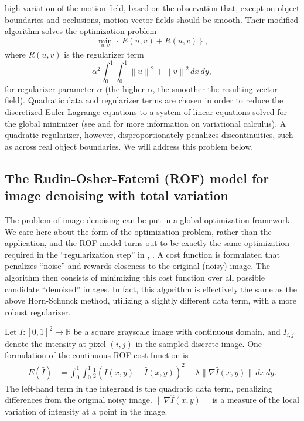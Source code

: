 \documentclass[conference]{IEEEtran}
\newcommand{\norm}[1]{\left\lVert#1\right\rVert}
\begin{document}
high variation of the motion field, based on the observation that, except on object boundaries and occlusions, motion vector fields should be smooth. Their modified algorithm
solves the optimization problem
\begin{equation}\label{horn_schunck_regularized}
    \min_{u,v}\left\{E(u, v) + R(u,v)\right\},
\end{equation}
where $R(u,v)$ is the regularizer term
    $$\alpha^2\int_0^1\int_0^1\norm{u}^2 + \norm{v}^2\,dx\,dy,$$
for regularizer parameter $\alpha$ (the higher $\alpha$, the smoother the resulting vector field).
Quadratic data and regularizer terms are chosen in order to reduce the discretized Euler-Lagrange equations to a system of linear equations solved for
the global minimizer (see \cite{variational_calculus} and \cite{variational_lectures} for more information on variational calculus).
A quadratic regularizer, however, disproportionately penalizes discontinuities, such as across real object boundaries. We will
address this problem below.

\subsection{The Rudin-Osher-Fatemi (ROF) model for image denoising with total variation}
The problem of image denoising can be put in a global optimization
framework. We care here about the form of the optimization problem, rather than the application, and the ROF model turns out to be exactly
the same optimization required in the ``regularization step'' in \cite{tv_optical_flow}, \cite{dense_geometry}.
A cost function is formulated that penalizes ``noise'' and rewards closeness to the original (noisy) image. The algorithm then
consists of minimizing this cost function over all possible candidate ``denoised'' images. In fact, this algorithm is effectively the same
as the above Horn-Schunck method, utilizing a slightly different data term, with a more robust regularizer.

Let $I:[0,1]^2 \rightarrow \mathbb{R}$ be a square grayscale image with continuous domain, and
$I_{i,j}$ denote the intensity at pixel $(i, j)$ in the sampled discrete image.
One formulation of the continuous ROF cost function is
\begin{equation}\label{rof_continuous}
\begin{split}
    E(\hat{I}) &= \int_0^1\int_0^1 \frac{1}{2} \left(I(x,y) - \hat{I}(x,y)\right)^2 + \lambda \|\nabla \hat{I}(x,y)\| \,dx \,dy.
\end{split}
\end{equation}
The left-hand term in the integrand is the quadratic data term, penalizing differences from the original noisy image.
$\|\nabla \hat{I}(x,y)\|$ is a measure of the local variation of intensity at a point in the image.
\end{document}
